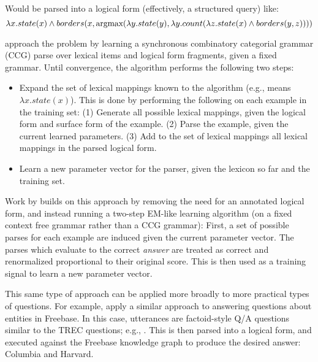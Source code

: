 \begin{displayquote}
\end{displayquote}

Would be parsed into a logical form (effectively, a structured query) like:
\begin{equation*}
\lambda x . state(x) \land borders(x, \mathop{\text{argmax}}( \lambda y . state(y), \lambda y . count (\lambda z . state(x) \land borders(y, z))))
\end{equation*}

 approach the problem by learning a synchronous
  combinatory categorial grammar (CCG) \cite{key:2004bos-ccg} 
  parse over lexical items and logical form fragments,
  given a fixed grammar.
Until convergence, the algorithm performs the following two steps:
\begin{itemize}
  \item Expand the set of lexical mappings
        known to the algorithm (e.g.,  means $\lambda x . state(x)$).
        This is done by performing the following on each example in the training set:
        (1) Generate all possible lexical mappings, given the logical form and surface
            form of the example.
        (2) Parse the example, given the current learned parameters.
        (3) Add to the set of lexical mappings all lexical mappings in the parsed
            logical form.
  \item Learn a new parameter vector for the parser, given the lexicon so far and the
        training set.
\end{itemize}

Work by  builds on this approach by removing the need for
  an annotated logical form, and instead running a two-step EM-like learning algorithm
  (on a fixed context free grammar rather than a CCG grammar):
First, a set of possible parses for each example are induced given the current parameter vector.
The parses which evaluate to the correct \textit{answer} are treated as correct and renormalized
  proportional to their original score.
This is then used as a training signal to learn a new parameter vector.

This same type of approach can be applied more broadly to more practical types of questions.
For example,  apply a similar approach to answering
  questions about entities in Freebase.
In this case, utterances are factoid-style Q/A questions similar to the TREC questions;
  e.g., .
This is then parsed into a logical form, and executed against the Freebase knowledge graph
  to produce the desired answer: Columbia and Harvard.


